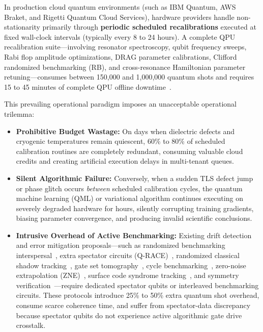 \documentclass[aps,pra,twocolumn,superscriptaddress,10pt,floatfix]{revtex4-2}
\begin{document}
In production cloud quantum environments (such as IBM Quantum, AWS Braket, and Rigetti Quantum Cloud Services), hardware providers handle non-stationarity primarily through \textbf{periodic scheduled recalibrations} executed at fixed wall-clock intervals (typically every 8 to 24 hours). A complete QPU recalibration suite—involving resonator spectroscopy, qubit frequency sweeps, Rabi flop amplitude optimizations, DRAG parameter calibrations, Clifford randomized benchmarking (RB), and cross-resonance Hamiltonian parameter retuning—consumes between 150,000 and 1,000,000 quantum shots and requires 15 to 45 minutes of complete QPU offline downtime~\cite{nation2021scalable,bravyi2021mitigating}.

This prevailing operational paradigm imposes an unacceptable operational trilemma:
\begin{itemize}
    \item \textbf{Prohibitive Budget Wastage:} On days when dielectric defects and cryogenic temperatures remain quiescent, 60\% to 80\% of scheduled calibration routines are completely redundant, consuming valuable cloud credits and creating artificial execution delays in multi-tenant queues.
    \item \textbf{Silent Algorithmic Failure:} Conversely, when a sudden TLS defect jump or phase glitch occurs \textit{between} scheduled calibration cycles, the quantum machine learning (QML) or variational algorithm continues executing on severely degraded hardware for hours, silently corrupting training gradients, biasing parameter convergence, and producing invalid scientific conclusions.
    \item \textbf{Intrusive Overhead of Active Benchmarking:} Existing drift detection and error mitigation proposals—such as randomized benchmarking interspersal~\cite{magesan2012efficient,magesan2011scalable}, extra spectator circuits (Q-RACE)~\cite{proctor2020detecting}, randomized classical shadow tracking~\cite{huang2020predicting,elben2023randomized,ramdas2020admissible}, gate set tomography~\cite{nielsen2021gate,blume2017demonstration}, cycle benchmarking~\cite{erhard2019characterizing}, zero-noise extrapolation (ZNE)~\cite{giurgicatiron2020digital,larose2022mitiq,temme2017error,endo2018practical}, surface code syndrome tracking~\cite{kelly2018physical}, and symmetry verification~\cite{sagastizabal2019experimental,bonetmonroig2018low,koczor2021exponential,huggins2021virtual,cai2023quantum}—require dedicated spectator qubits or interleaved benchmarking circuits. These protocols introduce 25\% to 50\% extra quantum shot overhead, consume scarce coherence time, and suffer from spectator-data discrepancy because spectator qubits do not experience active algorithmic gate drive crosstalk.
\end{itemize}
\end{document}
